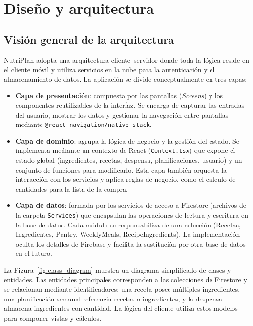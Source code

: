 \documentclass[twoside, openright, 11pt]{report}
\begin{document}
\chapter{Diseño y arquitectura}
\label{cap.diseno}

\section{Visión general de la arquitectura}
NutriPlan adopta una arquitectura cliente–servidor donde toda la lógica reside en el cliente móvil y utiliza servicios en la nube para la autenticación y el almacenamiento de datos. La aplicación se divide conceptualmente en tres capas:

\begin{itemize}
  \item \textbf{Capa de presentación}: compuesta por las pantallas (\emph{Screens}) y los componentes reutilizables de la interfaz. Se encarga de capturar las entradas del usuario, mostrar los datos y gestionar la navegación entre pantallas mediante \texttt{@react-navigation/native-stack}.
  \item \textbf{Capa de dominio}: agrupa la lógica de negocio y la gestión del estado. Se implementa mediante un contexto de React (\texttt{Context.tsx}) que expone el estado global (ingredientes, recetas, despensa, planificaciones, usuario) y un conjunto de funciones para modificarlo. Esta capa también orquesta la interacción con los servicios y aplica reglas de negocio, como el cálculo de cantidades para la lista de la compra.
  \item \textbf{Capa de datos}: formada por los servicios de acceso a Firestore (archivos de la carpeta \texttt{Services}) que encapsulan las operaciones de lectura y escritura en la base de datos. Cada módulo se responsabiliza de una colección (Recetas, Ingredientes, Pantry, WeeklyMeals, RecipeIngredients). La implementación oculta los detalles de Firebase y facilita la sustitución por otra base de datos en el futuro.
\end{itemize}

La Figura~\ref{fig:class_diagram} muestra un diagrama simplificado de clases y entidades. Las entidades principales corresponden a las colecciones de Firestore y se relacionan mediante identificadores: una receta posee múltiples ingredientes, una planificación semanal referencia recetas o ingredientes, y la despensa almacena ingredientes con cantidad. La lógica del cliente utiliza estos modelos para componer vistas y cálculos.
\end{document}
